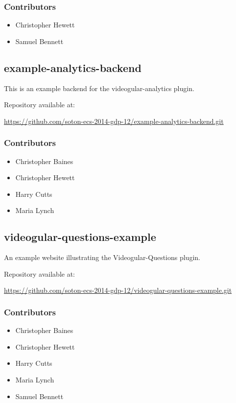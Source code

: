 \subsubsection{Contributors}
\begin{itemize}
  \item Christopher Hewett
  \item Samuel Bennett
\end{itemize}

\subsection{example-analytics-backend}
\label{Section:Repo_example_analytics_backend}

This is an example backend for the videogular-analytics plugin.

Repository available at:

\url{https://github.com/soton-ecs-2014-gdp-12/example-analytics-backend.git}

\subsubsection{Contributors}
\begin{itemize}
  \item Christopher Baines
  \item Christopher Hewett
  \item Harry Cutts
  \item Maria Lynch
\end{itemize}

\subsection{videogular-questions-example}
\label{Section:Repo_videogular-questions-example}

An example website illustrating the Videogular-Questions plugin.

Repository available at:

\url{https://github.com/soton-ecs-2014-gdp-12/videogular-questions-example.git}

\subsubsection{Contributors}
\begin{itemize}
  \item Christopher Baines
  \item Christopher Hewett
  \item Harry Cutts
  \item Maria Lynch
  \item Samuel Bennett
\end{itemize}

